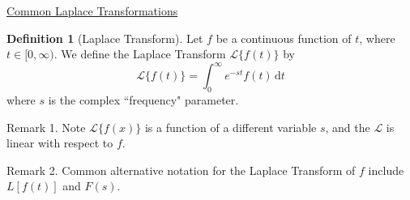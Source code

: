 \documentclass[letterpaper,11pt]{article} %
\theoremstyle{definition}
\newtheorem*{definition*}{Definition}
\begin{document}
    \begin{center}
        \LARGE{\underline{Common Laplace Transformations}} \\
    \end{center}

    \begin{definition*}[Laplace Transform]
        Let $f$ be a continuous function of $t$, where $t \in [0, \infty)$. We define the Laplace Transform $\mathcal L\{f(t)\}$ by
        \begin{equation*}
            \mathcal L\{f(t)\} = \int_0^\infty e^{-st} f(t) \, \mathrm dt
        \end{equation*}
        where $s$ is the complex ``frequency" parameter.
        
        Remark 1. Note $\mathcal L\{f(x)\}$ is a function of a different variable $s$, and the $\mathcal L$ is linear with respect to $f$.
        
        Remark 2. Common alternative notation for the Laplace Transform of $f$ include $L[f(t)]$ and $F(s)$.
    \end{definition*}
    
\end{document}
